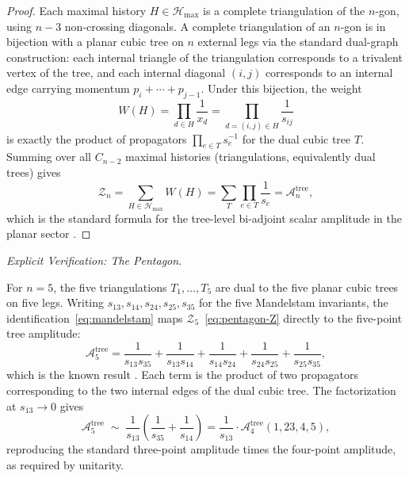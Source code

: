 \documentclass[11pt]{article}
\theoremstyle{plain}
\theoremstyle{definition}
\theoremstyle{remark}
\newcommand{\Hmax}{\mathcal{H}_{\max}}
\begin{document}
\begin{proof}
Each maximal history $H \in \Hmax$ is a complete triangulation of the
$n$-gon, using $n-3$ non-crossing diagonals. A complete triangulation of
an $n$-gon is in bijection with a planar cubic tree on $n$ external legs
via the standard dual-graph construction: each internal triangle of the
triangulation corresponds to a trivalent vertex of the tree, and each
internal diagonal $(i,j)$ corresponds to an internal edge carrying momentum
$p_i + \cdots + p_{j-1}$.
Under this bijection, the weight
\[
  W(H) = \prod_{d \in H} \frac{1}{x_d} = \prod_{d = (i,j) \in H}
  \frac{1}{s_{ij}}
\]
is exactly the product of propagators $\prod_{e \in T} s_e^{-1}$ for the
dual cubic tree $T$. Summing over all $C_{n-2}$ maximal histories
(triangulations, equivalently dual trees) gives
\[
  \mathcal{Z}_n = \sum_{H \in \Hmax} W(H) = \sum_T \prod_{e \in T}
  \frac{1}{s_e} = \mathcal{A}_n^{\mathrm{tree}},
\]
which is the standard formula for the tree-level bi-adjoint scalar
amplitude in the planar sector \cite{ABHY2018}. \end{proof}

\medskip\noindent\textit{Explicit Verification: The Pentagon.}

For $n = 5$, the five triangulations $T_1, \ldots, T_5$ are dual to the
five planar cubic trees on five legs. Writing $s_{13}, s_{14}, s_{24},
s_{25}, s_{35}$ for the five Mandelstam invariants, the
identification~\eqref{eq:mandelstam} maps
$\mathcal{Z}_5$~\eqref{eq:pentagon-Z} directly to the five-point tree
amplitude:
\[
  \mathcal{A}_5^{\mathrm{tree}} = \frac{1}{s_{13}s_{35}}
  + \frac{1}{s_{13}s_{14}} + \frac{1}{s_{14}s_{24}}
  + \frac{1}{s_{24}s_{25}} + \frac{1}{s_{25}s_{35}},
\]
which is the known result \cite{ArkaniHamedTalk, ABHY2018}.
Each term is the product of two propagators corresponding to the two
internal edges of the dual cubic tree.
The factorization at $s_{13} \to 0$ gives
\[
  \mathcal{A}_5^{\mathrm{tree}} \;\sim\; \frac{1}{s_{13}}
  \!\left(\frac{1}{s_{35}} + \frac{1}{s_{14}}\right)
  = \frac{1}{s_{13}} \cdot \mathcal{A}_4^{\mathrm{tree}}(1,23,4,5),
\]
reproducing the standard three-point amplitude times the four-point
amplitude, as required by unitarity.
\end{document}
